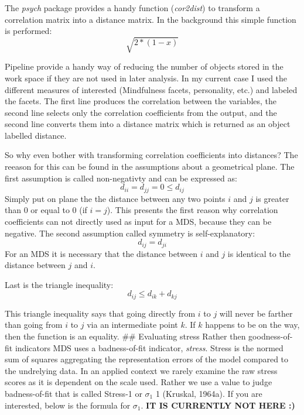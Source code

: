 \documentclass[]{article}
\newenvironment{Shaded}{\begin{snugshade}}{\end{snugshade}}
\newcommand{\KeywordTok}[1]{\textcolor[rgb]{0.13,0.29,0.53}{\textbf{#1}}}
\newcommand{\StringTok}[1]{\textcolor[rgb]{0.31,0.60,0.02}{#1}}
\newcommand{\OperatorTok}[1]{\textcolor[rgb]{0.81,0.36,0.00}{\textbf{#1}}}
\newcommand{\NormalTok}[1]{#1}
\begin{document}
The \emph{psych} package provides a handy function (\emph{cor2dist}) to
transform a correlation matrix into a distance matrix. In the background
this simple function is performed: \[\sqrt{2 * (1 - x)}\]

Pipeline provide a handy way of reducing the number of objects stored in
the work space if they are not used in later analysis. In my current
case I used the different measures of interested (Mindfulness facets,
personality, etc.) and labeled the facets. The first line produces the
correlation between the variables, the second line selects only the
correlation coefficients from the output, and the second line converts
them into a distance matrix which is returned as an object labelled
distance.

\begin{Shaded}
\end{Shaded}

So why even bother with transforming correlation coefficients into
distances? The reeason for this can be found in the assumptions about a
geometrical plane. The first assumption is called non-negativty and can
be expressed as: \[d_{ii} = d_{jj} = 0 ≤ d_{ij}\] Simply put on plane
the the distance between any two points \(i\) and \(j\) is greater than
0 or equal to 0 (if \(i = j\)). This presents the first reason why
correlation coefficients can not directly used as input for a MDS,
because they can be negative. The second assumption called symmetry is
self-explanatory: \[d_{ij} = d_{ji}\] For an MDS it is necessary that
the distance between \(i\) and \(j\) is identical to the distance
between \(j\) and \(i\).

Last is the triangle inequality: \[d_{ij} ≤ d_{ik} + d_{kj}\]

This triangle inequality says that going directly from \(i\) to \(j\)
will never be farther than going from \(i\) to \(j\) via an intermediate
point \(k\). If \(k\) happens to be on the way, then the function is an
equality. \#\# Evaluating stress Rather then goodness-of-fit indicators
MDS uses a badness-of-fit indicator, \emph{stress}. Stress is the normed
sum of squares aggregating the representation errors of the model
compared to the undrelying data. In an applied context we rarely examine
the raw stress scores as it is dependent on the scale used. Rather we
use a value to judge badness-of-fit that is called Stress-1 or
\(\sigma_1\) 1 (Kruskal, 1964a). If you are interested, below is the
formula for \(\sigma_1\). \textbf{IT IS CURRENTLY NOT HERE :)}
\end{document}
